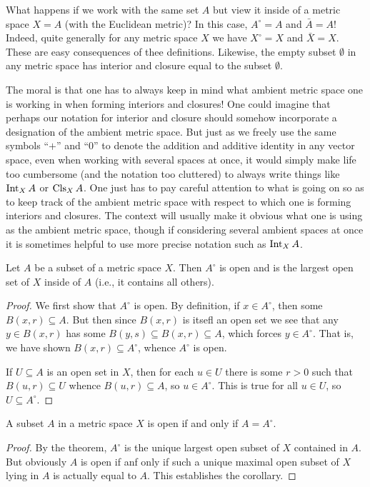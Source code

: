 \begin{example}
  What happens if we work with the same set \(A\) but view it inside of a
  metric space \(X=A\) (with the Euclidean metric)? In this case,
  \(A^\circ=A\) and \(\bar A=A\)! Indeed, quite generally for any metric
  space \(X\) we have \(X^\circ=X\) and \(\bar X=X\). These are easy
  consequences of thee definitions. Likewise, the empty subset
  \(\emptyset\) in any metric space has interior and closure equal to the
  subset \(\emptyset\).

  The moral is that one has to always keep in mind what ambient metric
  space one is working in when forming interiors and closures! One could
  imagine that perhaps our notation for interior and closure should somehow
  incorporate a designation of the ambient metric space. But just as we
  freely use the same symbols ``\(+\)'' and ``\(0\)'' to denote the
  addition and additive identity in any vector space, even when working
  with several spaces at once, it would simply make life too cumbersome
  (and the notation too cluttered) to always write things like \(\operatorname{Int}_X A\)
  or \(\operatorname{Cls}_X A\). One just has to pay careful attention to what is going
  on so as to keep track of the ambient metric space with respect to which
  one is forming interiors and closures. The context will usually make it
  obvious what one is using as the ambient metric space, though if
  considering several ambient spaces at once it is sometimes helpful to use
  more precise notation such as \(\operatorname{Int}_XA\).
\end{example}
\begin{theorem}
  Let \(A\) be a subset of a metric space \(X\). Then \(A^\circ\) is open
  and is the largest open set of \(X\) inside of \(A\) (i.e., it contains
  all others).
\end{theorem}
\begin{proof}
  We first show that \(A^\circ\) is open. By definition, if \(x\in
  A^\circ\), then some \(B(x,r)\subseteq A\). But then since \(B(x,r)\) is
  itsefl an open set we see that any \(y\in B(x,r)\) has some
  \(B(y,s)\subseteq B(x,r)\subseteq A\), which forces \(y\in
  A^\circ\). That is, we have shown \(B(x,r)\subseteq A^\circ\), whence
  \(A^\circ\) is open.

  If \(U\subseteq A\) is an open set in \(X\), then for each \(u\in U\)
  there is some \(r>0\) such that \(B(u,r)\subseteq U\) whence
  \(B(u,r)\subseteq A\), so \(u\in A^\circ\). This is true for all \(u\in
  U\), so \(U\subseteq A^\circ\).
\end{proof}
\begin{corollary}
  A subset \(A\) in a metric space \(X\) is open if and only if
  \(A=A^\circ\).
\end{corollary}
\begin{proof}
  By the theorem, \(A^\circ\) is the unique largest open subset of \(X\)
  contained in \(A\). But obviously \(A\) is open if anf only if such a
  unique maximal  open subset of \(X\) lying in \(A\) is actually equal to
  \(A\). This establishes the corollary.
\end{proof}

